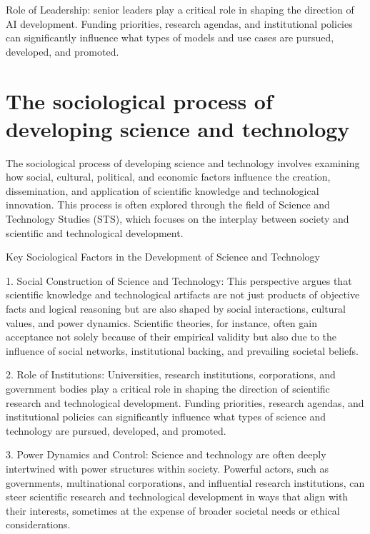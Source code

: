 Role of Leadership: senior leaders play a critical role in shaping the
direction of AI development. Funding priorities, research agendas, and
institutional policies can significantly influence what types of models
and use cases are pursued, developed, and promoted.

\section{The sociological process of developing science and
technology}\label{the-sociological-process-of-developing-science-and-technology}

The sociological process of developing science and technology involves
examining how social, cultural, political, and economic factors
influence the creation, dissemination, and application of scientific
knowledge and technological innovation. This process is often explored
through the field of Science and Technology Studies (STS), which focuses
on the interplay between society and scientific and technological
development.

Key Sociological Factors in the Development of Science and Technology

1. Social Construction of Science and Technology: This perspective
argues that scientific knowledge and technological artifacts are not
just products of objective facts and logical reasoning but are also
shaped by social interactions, cultural values, and power dynamics.
Scientific theories, for instance, often gain acceptance not solely
because of their empirical validity but also due to the influence of
social networks, institutional backing, and prevailing societal beliefs.

2. Role of Institutions: Universities, research institutions,
corporations, and government bodies play a critical role in shaping the
direction of scientific research and technological development. Funding
priorities, research agendas, and institutional policies can
significantly influence what types of science and technology are
pursued, developed, and promoted.

3. Power Dynamics and Control: Science and technology are often deeply
intertwined with power structures within society. Powerful actors, such
as governments, multinational corporations, and influential research
institutions, can steer scientific research and technological
development in ways that align with their interests, sometimes at the
expense of broader societal needs or ethical considerations.


